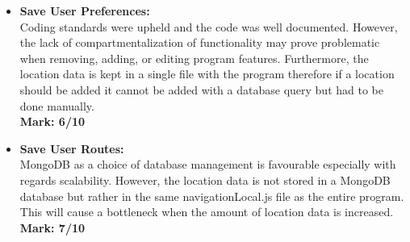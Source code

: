 \begin{itemize}
	
\item \textbf{Save User Preferences:}\\Coding standards were upheld and the code was well documented. However, the lack of compartmentalization of functionality may prove problematic when  removing, adding, or editing program features. Furthermore, the location data is kept in a single file with the program therefore if a location should be added it cannot be added with a database query but had to be done manually.\\
	\textbf{Mark: 6/10}
\item \textbf{Save User Routes:}\\MongoDB as a choice of database management is favourable especially with regards scalability. However, the location data is not stored in a MongoDB database but rather in the same navigationLocal.js file as the entire program. This will cause a bottleneck when the amount of location data is increased.\\
	\textbf{Mark: 7/10}

\end{itemize}